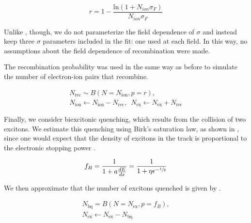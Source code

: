 \begin{equation}
        \label{eqn:nerix_recombination}
        r = 1 - \frac{\textrm{ln}(1 + N_{ion} \sigma_F)}{N_{ion} \sigma_F}
\end{equation}

Unlike , though, we do not parameterize the field dependence of $\sigma$ and instead keep three $\sigma$ parameters included in the fit: one used at each field.  In this way, no assumptions about the field dependence of recombination were made.  

The recombination probability was used in the same way as before to simulate the number of electron-ion pairs that recombine.


\begin{equation}
        \label{eqn:xe1t_nr_recombination}
        \begin{gathered}
                N_{\textrm{rec}} \sim B(N = N_{\textrm{ion}}, p = r), \\ 
                N_{\textrm{ion}} \leftarrow N_{\textrm{ion}} - N_{\textrm{rec}}, \, \, \,  N_{\textrm{ex}} \leftarrow N_{\textrm{ex}} + N_{\textrm{rec}}
        \end{gathered}
\end{equation}


Finally, we consider biexcitonic quenching, which results from the collision of two excitons.  We estimate this quenching using Birk's saturation law, as shown in , since one would expect that the density of excitons in the track is proportional to the electronic stopping power \cite{mei2008model, tretyak2010semi, bezrukov2011interplay}.


\begin{equation}
        \label{eqn:nerix_birks_quenching}
        f_B = \frac{1}{1 + a \frac{dE}{dx}} = \frac{1}{1 + \eta \epsilon^{- \sfrac{1}{2}}}
\end{equation}

We then approximate that the number of excitons quenched is given by .

\begin{equation}
        \label{eqn:nerix_biexcitonic_quenching}
        \begin{gathered}
                N_{\textrm{bq}} = B(N=N_{\textrm{ex}}, p = f_B), \\
                N_{\textrm{ex}} \leftarrow N_{\textrm{ex}} - N_{\textrm{bq}}
        \end{gathered}
\end{equation}



